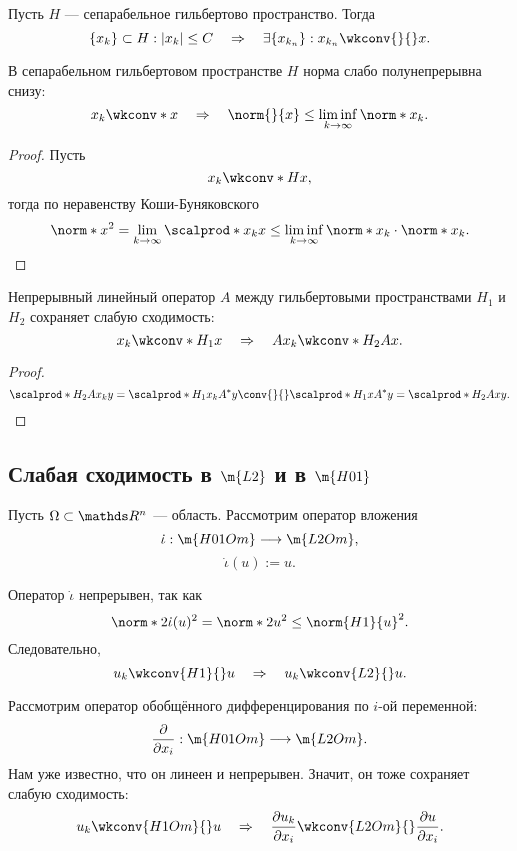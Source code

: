 \begin{note} Пусть $H$ --- сепарабельное гильбертово пространство. Тогда
$$ \{ x_k \} \subset H : |x_k| \leq C \quad \Rightarrow \quad \exists \{ x_{k_n} \} : x_{k_n} \wkconv{}{} x.$$
\end{note}

\begin{note} В сепарабельном гильбертовом пространстве $H$ норма слабо полунепрерывна снизу:
$$x_k \wkconv*{}{} x \quad \Rightarrow \quad \norm{}{x} \leq \liminf_{k \to \infty} \norm*{}{x_k}.$$
\end{note}
\begin{proof}
Пусть 
$$ x_k \wkconv*{H}{} x,$$
тогда по неравенству Коши-Буняковского
$$ \norm*{}{x}^2 = \lim_{k \to \infty} \scalprod*{}{x_k}{x} \leq \liminf_{k \to \infty} \norm*{}{x_k} \cdot \norm*{}{x_k}.$$
\end{proof}


\begin{note} Непрерывный линейный оператор $A$ между гильбертовыми пространствами $H_1$ и $H_2$  сохраняет слабую сходимость:
$$ x_k \wkconv*{H_1}{} x \quad \Rightarrow \quad Ax_k \wkconv*{H_2}{} Ax.$$
\end{note}
\begin{proof}
$$ \scalprod*{H_2}{A x_k} {y} = \scalprod*{H_1}{x_k}{A^*y} \conv{}{} \scalprod*{H_1}{x}{A^*y} = \scalprod*{H_2}{Ax}{y}.$$

\end{proof}

\subsection{Слабая сходимость в $\m{L2}$ и в $\m{H01}$}
Пусть $\Omega \subset \real^n$ --- область. Рассмотрим оператор вложения
$$\dot{\iota} : \m{H01Om} \longrightarrow \m{L2Om},$$
$$\dot{\iota}(u) := u.$$

Оператор $\dot{\iota}$ непрерывен, так как
$$ \norm*{2}{\dot{\iota}}(u)^2 = \norm*{2}{u}^2 \leq \norm{H1}{u}^2.$$
Следовательно,
$$ u_k \wkconv{H1}{} u \quad \Rightarrow \quad u_k \wkconv{L2}{} u.$$

Рассмотрим оператор обобщённого дифференцирования по $i$-ой переменной:
$$ \pder{x_i} : \m{H01Om} \longrightarrow \m{L2Om}.$$
Нам уже известно, что он линеен и непрерывен. Значит, он тоже сохраняет слабую сходимость:
$$ u_k \wkconv{H1Om}{} u \quad \Rightarrow \quad \pder[u_k]{x_i} \wkconv{L2Om}{} \pder[u]{x_i}.$$

